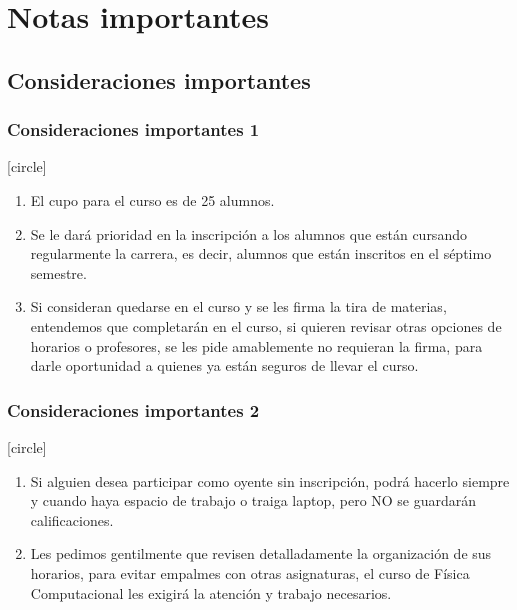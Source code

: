 \documentclass[12pt]{beamer}
\newcounter{saveenumi}
\newcommand{\seti}{\setcounter{saveenumi}{\value{enumi}}}
\newcommand{\conti}{\setcounter{enumi}{\value{saveenumi}}}
\begin{document}
\section{Notas importantes}
\subsection{Consideraciones importantes}
\begin{frame}
\frametitle{Consideraciones importantes 1}
\fontsize{12}{12}
[circle]
\begin{enumerate}[<+->]
\item El cupo para el curso es de 25 alumnos.
\item Se le dará prioridad en la inscripción a los alumnos que están cursando regularmente la carrera, es decir, alumnos que están inscritos en el séptimo semestre.
\item Si consideran quedarse en el curso y se les firma la tira de materias, entendemos que completarán en el curso, si quieren revisar otras opciones de horarios o profesores, se les pide amablemente no requieran la firma, para darle oportunidad a quienes ya están seguros de llevar el curso.
\seti
\end{enumerate}
\end{frame}
\begin{frame}
\frametitle{Consideraciones importantes 2}
\fontsize{12}{12}
[circle]
\begin{enumerate}[<+->]
\conti
\item Si alguien desea participar como oyente sin inscripción, podrá hacerlo siempre y cuando haya espacio de trabajo o traiga laptop, pero NO se guardarán calificaciones.
\item Les pedimos gentilmente que revisen detalladamente la organización de sus horarios, para evitar empalmes con otras asignaturas, el curso de Física Computacional les exigirá la atención y trabajo necesarios.
\end{enumerate}
\end{frame}
\end{document}
